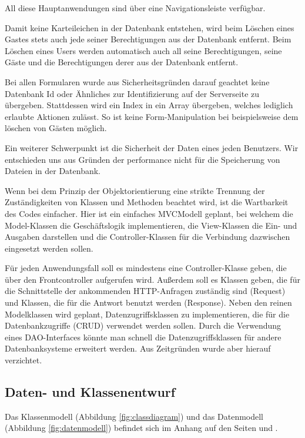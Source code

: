\documentclass[10.5pt]{scrarticle}
\begin{document}
All diese Hauptanwendungen sind über eine Navigationsleiste verfügbar.

Damit keine Karteileichen in der Datenbank entstehen, wird beim Löschen eines Gastes stets auch jede seiner Berechtigungen aus der Datenbank entfernt. Beim Löschen eines Users werden automatisch auch all seine Berechtigungen, seine Gäste und die Berechtigungen derer aus der Datenbank entfernt.

Bei allen Formularen wurde aus Sicherheitsgründen darauf geachtet keine Datenbank Id oder Ähnliches zur Identifizierung auf der Serverseite zu übergeben. Stattdessen wird ein Index in ein Array übergeben, welches lediglich erlaubte Aktionen zulässt. So ist keine Form-Manipulation bei beispielsweise dem löschen von Gästen möglich.

Ein weiterer Schwerpunkt ist die Sicherheit der Daten eines jeden Benutzers. Wir entschieden uns aus Gründen der performance nicht für die Speicherung von Dateien in der Datenbank.

Wenn bei dem Prinzip der Objektorientierung eine strikte Trennung der Zuständigkeiten von Klassen und Methoden beachtet wird, ist die Wartbarkeit des Codes einfacher. Hier ist ein einfaches MVCModell geplant, bei welchem die Model-Klassen die Geschäftslogik implementieren, die View-Klassen die Ein- und Ausgaben darstellen und die Controller-Klassen für die Verbindung dazwischen eingesetzt werden sollen. 

 Für jeden Anwendungsfall soll es mindestens eine Controller-Klasse geben, die über den Frontcontroller aufgerufen wird. Außerdem soll es Klassen geben, die für die Schnittstelle der ankommenden HTTP-Anfragen zuständig sind (Request) und Klassen, die für die Antwort benutzt werden (Response). Neben den reinen Modelklassen wird geplant, Datenzugriffsklassen zu implementieren, die für die Datenbankzugriffe (CRUD) verwendet werden sollen. Durch die Verwendung eines DAO-Interfaces könnte man schnell die Datenzugriffsklassen für andere Datenbanksysteme erweitert werden. Aus Zeitgründen wurde aber hierauf verzichtet. 

\subsection{Daten- und Klassenentwurf}

Das Klassenmodell (Abbildung \ref{fig:classdiagram}) und das Datenmodell (Abbildung \ref{fig:datenmodell}) befindet sich im Anhang auf den Seiten \pageref{fig:classdiagram} und \pageref{fig:datenmodell}.
\end{document}
